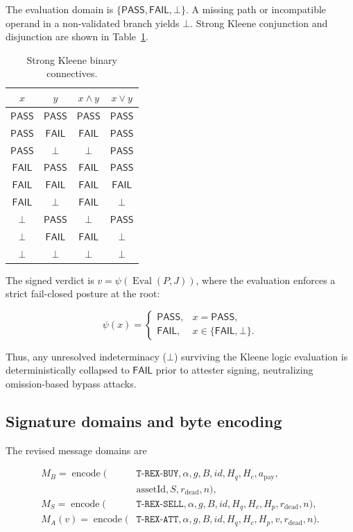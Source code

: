 \documentclass[fleqn,10pt,lineno]{wlpeerj}
\newcommand{\PASS}{\mathsf{PASS}}
\newcommand{\FAIL}{\mathsf{FAIL}}
\newcommand{\enc}{\operatorname{encode}}
\newcommand{\Eval}{\operatorname{Eval}}
\begin{document}
The evaluation domain is $\{\PASS,\FAIL,\bot\}$. A missing path or incompatible operand in a non-validated branch yields $\bot$. Strong Kleene conjunction and disjunction are shown in Table~\ref{tab:kleene}. 

\begin{table}[htbp]
\centering
\small
\caption{Strong Kleene binary connectives.}
\label{tab:kleene}
\begin{tabular}{cccc}
\toprule
$x$ & $y$ & $x\land y$ & $x\lor y$\\
\midrule
$\PASS$ & $\PASS$ & $\PASS$ & $\PASS$\\
$\PASS$ & $\FAIL$ & $\FAIL$ & $\PASS$\\
$\PASS$ & $\bot$ & $\bot$ & $\PASS$\\
$\FAIL$ & $\PASS$ & $\FAIL$ & $\PASS$\\
$\FAIL$ & $\FAIL$ & $\FAIL$ & $\FAIL$\\
$\FAIL$ & $\bot$ & $\FAIL$ & $\bot$\\
$\bot$ & $\PASS$ & $\bot$ & $\PASS$\\
$\bot$ & $\FAIL$ & $\FAIL$ & $\bot$\\
$\bot$ & $\bot$ & $\bot$ & $\bot$\\
\bottomrule
\end{tabular}
\end{table}

The signed verdict is $v=\psi(\Eval(P,J))$, where the evaluation enforces a strict fail-closed posture at the root:

\begin{equation}
\psi(x)=
\begin{cases}
\PASS,&x=\PASS,\\
\FAIL,&x\in\{\FAIL,\bot\}.
\end{cases}
\end{equation}

Thus, any unresolved indeterminacy ($\bot$) surviving the Kleene logic evaluation is deterministically collapsed to $\mathsf{FAIL}$ prior to attester signing, neutralizing omission-based bypass attacks.

\subsection{Signature domains and byte encoding}

The revised message domains are

\begin{align}
M_B=\enc\bigl(&\texttt{T-REX-BUY},\alpha,g,B,id,H_q,H_c,
               a_{\mathrm{pay}},\nonumber\\
             &\mathrm{assetId},S,r_{\mathrm{dead}},n\bigr),\\
M_S=\enc\bigl(&\texttt{T-REX-SELL},\alpha,g,B,id,H_q,H_c,
               H_p,r_{\mathrm{dead}},n\bigr),\\
M_A(v)=\enc\bigl(&\texttt{T-REX-ATT},\alpha,g,B,id,H_q,H_c,
               H_p,v,r_{\mathrm{dead}},n\bigr).
\end{align}
\end{document}
